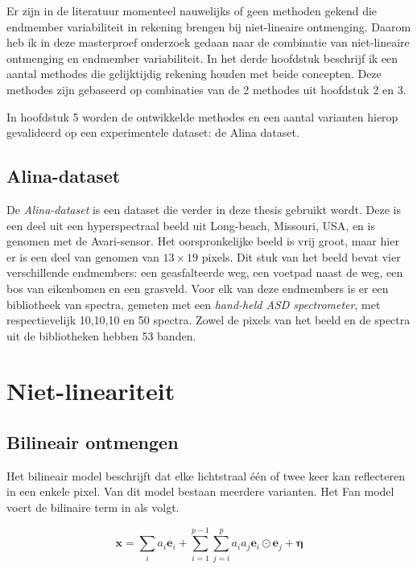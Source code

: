 \documentclass[12pt]{report}
\begin{document}
Er zijn in de literatuur momenteel nauwelijks of geen methoden gekend die endmember variabiliteit in rekening brengen bij niet-lineaire ontmenging. Daarom heb ik in deze masterproef onderzoek gedaan naar de combinatie van niet-lineaire ontmenging en endmember variabiliteit. In het derde hoofdstuk beschrijf ik een aantal methodes die gelijktijdig rekening houden met beide concepten. Deze methodes zijn gebaseerd op combinaties van de 2 methodes uit hoofdstuk 2 en 3.
	
In hoofdstuk 5 worden de ontwikkelde methodes en een aantal varianten hierop gevalideerd  op een experimentele dataset: de Alina dataset\cite{Alina}.  

\section{Alina-dataset}\cite{Alina}

De \textit{Alina-dataset} is een dataset die verder in deze thesis gebruikt wordt. Deze is een deel uit een hyperspectraal beeld uit Long-beach, Missouri, USA, en is genomen met de Avari-sensor. Het oorspronkelijke beeld is vrij groot, maar hier er is een deel van genomen van $13\times 19$ pixels. Dit stuk van het beeld bevat vier verschillende endmembers: een geasfalteerde weg, een voetpad naast de weg, een bos van eikenbomen en een grasveld. Voor elk van deze endmembers is er een bibliotheek van spectra, gemeten met een \textit{hand-held ASD spectrometer}, met respectievelijk 10,10,10 en 50 spectra. Zowel de pixels van het beeld en de spectra uit de bibliotheken hebben 53 banden. 




\newpage



\chapter{Niet-lineariteit\cite{mlinmix}}


\section{Bilineair ontmengen}

Het bilineair model beschrijft dat elke lichtstraal \'e\'en of twee keer kan reflecteren in een enkele pixel. Van dit model bestaan meerdere varianten. Het Fan model\cite{mlinmix} voert de bilinaire term in als volgt.

\begin{equation}
\bm{x} = \sum_i a_i \bm{e}_i + \sum_{i=1}^{p-1} \sum_{j=i}^{p} a_i a_j \bm{e}_i \odot \bm{e}_j + \bm{\eta}
\end{equation}
\end{document}
